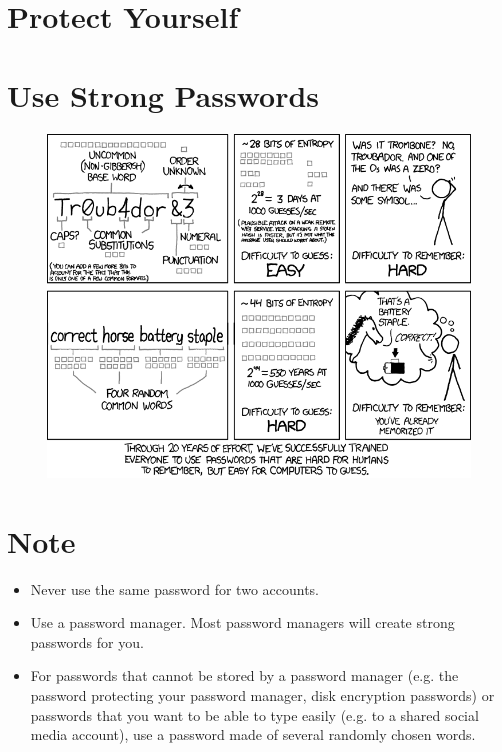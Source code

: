\documentclass[10pt, oneside]{book}
\begin{document}
	\frontmatter
	\section*{\Huge \center Protect Yourself}
	\section*{\Large \center Use Strong Passwords}
	\begin{figure}[h]
		\centering  
		\includegraphics[scale=0.45]{password_strength.png}
	\end{figure}
	
	\mainmatter
	\centering
	\section*{Note}
	\begin{itemize}
		\item Never use the same password for two accounts.\\
		\item Use a password manager.  Most password managers will create strong
		passwords for you.\\
		\item For passwords that cannot be stored by a password manager (e.g. the
		password protecting your password manager, disk encryption passwords) or
		passwords that you want to be able to type easily (e.g. to a shared
		social media account), use a password made of several randomly chosen words.\\
	\end{itemize}
	\pagebreak
\end{document}
